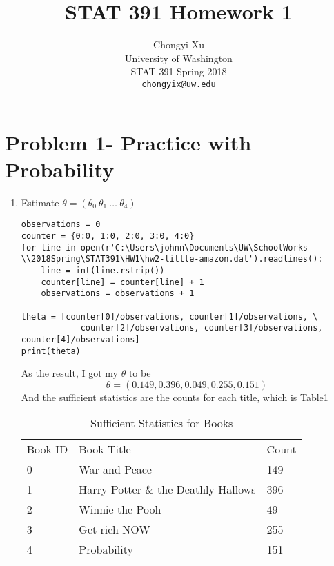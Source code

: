 \documentclass[preprint,12pt]{elsarticle}
\begin{document}
    \title{\LARGE \bf
        STAT 391 Homework 1
        }
        
        \author{ \parbox{3 in}{\centering Chongyi Xu \\
                 University of Washington\\
                 STAT 391 Spring 2018\\
                 {\tt\small chongyix@uw.edu}}
        }
    \maketitle

    \section{Problem 1- Practice with Probability}
    \begin{enumerate}[label=\alph*]
        \item Estimate $\theta = (\theta_0\ \theta_1\ \dots\ \theta_4)$
        \begin{lstlisting}
observations = 0
counter = {0:0, 1:0, 2:0, 3:0, 4:0}
for line in open(r'C:\Users\johnn\Documents\UW\SchoolWorks
\\2018Spring\STAT391\HW1\hw2-little-amazon.dat').readlines():
    line = int(line.rstrip())
    counter[line] = counter[line] + 1
    observations = observations + 1

theta = [counter[0]/observations, counter[1]/observations, \
            counter[2]/observations, counter[3]/observations, counter[4]/observations]
print(theta)
        \end{lstlisting}
        As the result, I got my $\theta$ to be
        \begin{equation*}
            \theta = (0.149, 0.396, 0.049, 0.255, 0.151)
        \end{equation*}
        And the sufficient statistics are the counts for each title, which is Table\ref{table1}
        \begin{table}[]
            \centering
            \caption{Sufficient Statistics for Books}
            \label{table1}
            \begin{tabular}{lll}
            Book ID & Book Title                          & Count \\
            0       & War and Peace                       & 149   \\
            1       & Harry Potter \& the Deathly Hallows & 396   \\
            2       & Winnie the Pooh                     & 49    \\
            3       & Get rich NOW                        & 255   \\
            4       & Probability                         & 151  
            \end{tabular}
        \end{table}


\end{enumerate}
\end{document}
